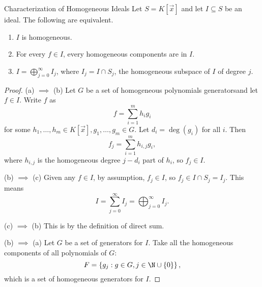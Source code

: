 \documentclass[co439]{subfiles}
\begin{document}
    \begin{prop}{Characterization of Homogeneous Ideals}
        Let $S = K\left[ \vec{x} \right]$ and let $I\subseteq S$ be an ideal. The following are equivalent.
        \begin{enumerate}
            \item $I$ is homogeneous.
            \item For every $f\in I$, every homogeneous components are in $I$.\footnotemark[1]
            \item $I = \bigoplus^{\infty}_{j=0} I_j$, where $I_j = I\cap S_j$, the homogeneous subspace of $I$ of degree $j$.
        \end{enumerate}
        
        \noindent
        \begin{minipage}{\textwidth}
        \end{minipage}
    \end{prop}

    \begin{proof}
        (a) $\implies$ (b) Let $G$ be a set of homogeneous polynomials generators\footnotemark[1] and let $f\in I$. Write $f$ as
        \begin{equation*}
            f = \sum^{m}_{i=1} h_ig_i
        \end{equation*}
        for some $h_1,\ldots,h_m\in K\left[ \vec{x} \right], g_1,\ldots,g_m\in G$. Let $d_i = \deg\left( g_i \right)$ for all $i$. Then
        \begin{equation*}
            f_j = \sum^{m}_{i=1} h_{i,j}g_i,
        \end{equation*}
        where $h_{i,j}$ is the homogeneous degree $j-d_i$ part of $h_i$, so $f_j\in I$.

        (b) $\implies$ (c) Given any $f\in I$, by assumption, $f_j\in I$, so $f_j\in I\cap S_j = I_j$. This means
        \begin{equation*}
            I = \sum^{\infty}_{j=0} I_j = \bigoplus^{\infty}_{j=0} I_j.
        \end{equation*}

        (c) $\implies$ (b) This is by the definition of direct sum.

        (b) $\implies$ (a) Let $G$ be a set of generators for $I$. Take all the homogeneous components of all polynomials of $G$:
        \begin{equation*}
            F = \left\lbrace g_j : g\in G, j\in\N\cup\left\lbrace 0 \right\rbrace \right\rbrace,
        \end{equation*}
        which is a set of homogeneous generators for $I$.
        
        \noindent
        \begin{minipage}{\textwidth}
        \end{minipage}
    \end{proof}
    
\end{document}
